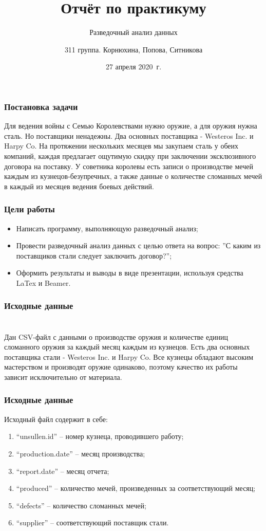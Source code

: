 \documentclass{beamer}
\begin{document}
\title[Разведочный анализ данных]
{
    Отчёт по практикуму
}
\subtitle
{Разведочный анализ данных}
\author[311 группа. Корнюхина, Попова, Ситникова]{
311 группа. Корнюхина, Попова, Ситникова}
\date{
    27 апреля 2020~г.
}
\frame{\titlepage}

\begin{frame}
\frametitle{Постановка задачи}
Для ведения войны с Семью Королевствами нужно оружие, а для оружия нужна сталь. Но поставщики ненадежны. Два основных поставщика -  Westeros Inc. и Harpy Co. На протяжении нескольких месяцев мы закупаем сталь у обеих компаний, каждая предлагает ощутимую скидку при заключении эксклюзивного договора на поставку. У советника королевы есть записи о производстве мечей каждым из кузнецов-безупречных, а также данные о количестве сломанных мечей в каждый из месяцев ведения боевых действий.
\end{frame}

\begin{frame}\frametitle{Цели работы}
\begin{itemize}
\item<2-> Написать программу, выполняющую разведочный анализ;
\item<3-> Провести разведочный анализ данных с целью ответа на вопрос:
”С каким из поставщиков стали следует заключить договор?”;
\item<4-> Оформить результаты и выводы в виде презентации, используя
средства LaTex и Beamer.
\end{itemize}
\end{frame}

\begin{frame}
\frametitle{Исходные данные}
\section{}
Дан CSV-файл с данными о производстве оружия и количестве единиц сломанного оружия за каждый месяц каждым из кузнецов. Есть два основных поставщика стали - Westeros Inc. и Harpy Co. Все кузнецы обладают высоким мастерством и производят оружие одинаково, поэтому качество их работы зависит исключительно от материала.
\end{frame}

\begin{frame}\frametitle{Исходные данные}
Исходный файл содержит в себе:
\begin{enumerate}
\item “unsullen.id” – номер кузнеца, проводившего работу;
\item “production.date” – месяц производства;
\item “report.date” – месяц отчета;
\item “produced” – количество мечей, произведенных за соответствующий месяц;
\item “defects” – количество сломанных мечей;
\item “supplier” – соответствующий поставщик стали.
\end{enumerate}
\end{frame}
\end{document}
